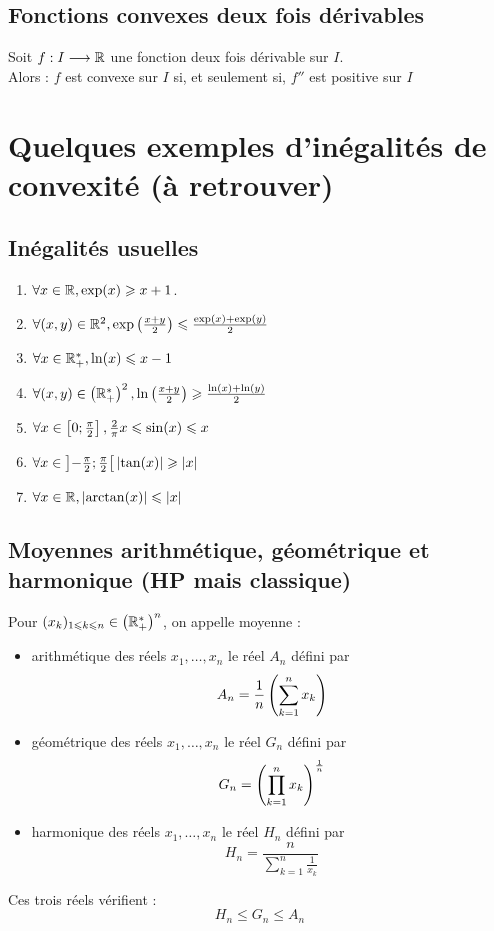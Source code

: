 \subsection{Fonctions convexes deux fois dérivables}
\begin{defprop}
    Soit \(f : I \longrightarrow \mathbb{R}\) une fonction deux fois dérivable sur \(I\).\\
    Alors : \(f\) est convexe sur \(I\) si, et seulement si, \(f ''\) est positive sur \(I\)
\end{defprop}
\section{Quelques exemples d’inégalités de convexité (à retrouver)}
\subsection{Inégalités usuelles}
\begin{defprop}
    \begin{enumerate}
        \item \( \forall x \in \mathbb{R}, \exp (x) \geqslant x + 1\).
        \item \(\forall (x, y) \in \mathbb{R}^2, \exp \left(\frac{x + y}{2}\right)\leqslant \frac{\exp(x) + \exp(y)}{2}\) 
        \item \(\forall x \in \mathbb{R}_+^*, \ln (x) \leqslant x - 1\)
        \item \(\forall (x, y) \in \left(\mathbb{R}_+^*\right)^2 , \ln \left(\frac{x + y}{2}\right)\geqslant \frac{\ln(x) + \ln(y)}{2}\) 
        \item \(\forall x \in \left[0;\frac{\pi}{2}\right], \frac{2}{\pi}x \leqslant \sin (x) \leqslant x\)
        \item \(\forall x \in \left]- \frac{\pi}{2};\frac{\pi}{2}\right[ \left\lvert\tan(x)\right\rvert \geqslant \left\lvert x\right\rvert\)
        \item \(\forall x \in \mathbb{R}, \left\lvert\arctan(x)\right\rvert \leqslant \left\lvert x\right\rvert\)
    \end{enumerate}
\end{defprop}

\subsection{Moyennes arithmétique, géométrique et harmonique (HP mais classique)}
\begin{defprop}
    Pour \((x_k)_{1\leqslant k\leqslant n} \in \left(\mathbb{R}_+^*\right)^n\), on appelle moyenne :
    \begin{itemize}
        \item arithmétique des réels \(x_1, \dots , x_n\) le réel \(A_n\) défini par
            \[A_n = \frac{1}{n} \left(\sum^n_{k=1} x_k\right)\]
        \item géométrique des réels \(x_1, \dots , x_n\) le réel \(G_n\) défini par
            \[G_n =\left(\prod^n_{k=1} x_k\right)^{\frac{1}{n}}\]
        \item harmonique des réels \(x_1, \dots , x_n\) le réel \(H_n\) défini par
        \[H_n = \frac{n}{\sum_{k=1}^n \frac{1}{x_k}}\]
    \end{itemize}
    Ces trois réels vérifient :
    \[H_n \leq G_n \leq A_n\]
\end{defprop}